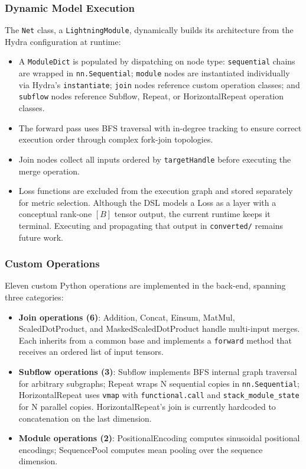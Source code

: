 \documentclass[11pt,a4paper]{article}
\begin{document}
\subsubsection{Dynamic Model Execution}

The \texttt{Net} class, a \texttt{LightningModule}, dynamically builds its architecture from the Hydra configuration at runtime:

\begin{itemize}
	\item A \texttt{ModuleDict} is populated by dispatching on node type: \texttt{sequential} chains are wrapped in \texttt{nn.Sequential}; \texttt{module} nodes are instantiated individually via Hydra's \texttt{instantiate}; \texttt{join} nodes reference custom operation classes; and \texttt{subflow} nodes reference Subflow, Repeat, or HorizontalRepeat operation classes.
	\item The forward pass uses BFS traversal with in-degree tracking to ensure correct execution order through complex fork-join topologies.
	\item Join nodes collect all inputs ordered by \texttt{targetHandle} before executing the merge operation.
	\item Loss functions are excluded from the execution graph and stored separately for metric selection. Although the DSL models a Loss as a layer with a conceptual rank-one $[B]$ tensor output, the current runtime keeps it terminal. Executing and propagating that output in \texttt{converted/} remains future work.
\end{itemize}

\subsubsection{Custom Operations}

Eleven custom Python operations are implemented in the back-end, spanning three categories:

\begin{itemize}
	\item \textbf{Join operations (6)}: Addition, Concat, Einsum, MatMul, ScaledDotProduct, and MaskedScaledDotProduct handle multi-input merges. Each inherits from a common base and implements a \texttt{forward} method that receives an ordered list of input tensors.
	\item \textbf{Subflow operations (3)}: Subflow implements BFS internal graph traversal for arbitrary subgraphs; Repeat wraps N sequential copies in \texttt{nn.Sequential}; HorizontalRepeat uses \texttt{vmap} with \texttt{functional.call} and \texttt{stack\_module\_state} for N parallel copies. HorizontalRepeat's join is currently hardcoded to concatenation on the last dimension.
	\item \textbf{Module operations (2)}: PositionalEncoding computes sinusoidal positional encodings; SequencePool computes mean pooling over the sequence dimension.
\end{itemize}
\end{document}

